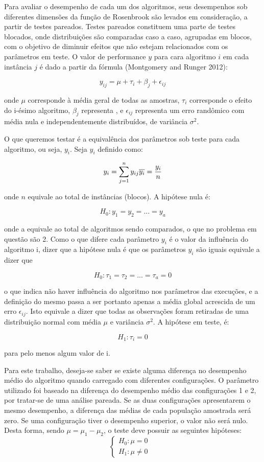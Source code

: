 \documentclass[]{article}
\begin{document}
Para avaliar o desempenho de cada um dos algoritmos, seus desempenhos
sob diferentes dimensões da função de Rosenbrook são levados em
consideração, a partir de testes pareados. Testes pareados constituem
uma parte de testes blocados, onde distribuições são comparadas caso a
caso, agrupadas em blocos, com o objetivo de diminuir efeitos que não
estejam relacionados com os parâmetros em teste. O valor de performance
\(y\) para cara algoritmo \(i\) em cada instância \(j\) é dado a partir
da fórmula (Montgomery and Runger 2012):

\[
y_{ij} = \mu + \tau_i + \beta_j + \epsilon_{ij}
\]

onde \(\mu\) corresponde à média geral de todas as amostras, \(\tau_i\)
corresponde o efeito do i-ésimo algoritmo, \(\beta_j\) representa , e
\(\epsilon_{ij}\) representa um erro randômico com média nula e
independentemente distribuídos, de variância \(\sigma^2\).

O que queremos testar é a equivalência dos parâmetros sob teste para
cada algoritmo, ou seja, \(y_i\). Seja \(y_i\) definido como:

\[
  y_i = \sum^{n}_{j = 1} y_{ij} \\
  \overline{y_i} = \frac{y_i}{n}
\]

onde \(n\) equivale ao total de instâncias (blocos). A hipótese nula é:

\[
H_0: y_1 = y_2 = ... = y_a
\]

onde a equivale ao total de algoritmos sendo comparados, o que no
problema em questão são 2. Como o que difere cada parâmetro \(y_i\) é o
valor da influência do algoritmo i, dizer que a hipótese nula é que os
parâmetros \(y_i\) são iguais equivale a dizer que

\[
H_0: \tau_1 = \tau_2 = ... = \tau_a = 0
\]

o que indica não haver influência do algoritmo nos parâmetros das
execuções, e a definição do mesmo passa a ser portanto apenas a média
global acrescida de um erro \(\epsilon_{ij}\). Isto equivale a dizer que
todas as observações foram retiradas de uma distribuição normal com
média \(\mu\) e variância \(\sigma^2\). A hipótese em teste, é:

\[
H_1: \tau_i = 0 
\]

para pelo menos algum valor de i.

Para este trabalho, deseja-se saber se existe alguma diferença no
desempenho médio do algoritmo quando carregado com diferentes
configurações. O parâmetro utilizado foi baseado na diferença do
desempenho médio das configurações 1 e 2, por tratar-se de uma análise
pareada. Se as duas configurações apresentarem o mesmo desempenho, a
diferença das médias de cada população amostrada será zero. Se uma
configuração tiver o desempenho superior, o valor não será nulo. Desta
forma, sendo \(\mu= \mu_1 - \mu_2\), o teste deve possuir as seguintes
hipóteses: \[
\begin{cases} H_0: \mu= 0 & \\ 
H_1: \mu\neq 0 \end{cases}
\]
\end{document}
